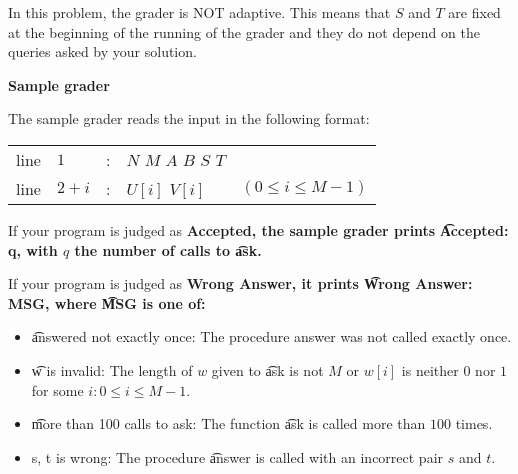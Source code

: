 In this problem, the grader is NOT adaptive. This means that $S$ and $T$ are fixed at the beginning of the running of the grader and they do not depend on the queries asked by your solution.

\bf{Sample grader}

The sample grader reads the input in the following format:

\begin{tabular}{lllll}
line&$1$&:&$N$ $M$ $A$ $B$ $S$ $T$&\\
line&$2+i$&:&$U[i]$ $V[i]$&$(0 \le i \le M-1)$\\
\end{tabular}

If your program is judged as \bf{Accepted}, the sample grader prints \t{Accepted: q}, with $q$ the number of calls to \t{ask}.

If your program is judged as \bf{Wrong Answer}, it prints \t{Wrong Answer: MSG}, where \t{MSG} is one of:

\begin{itemize}
\item \t{answered not exactly once}: The procedure answer was not called exactly once. 
\item \t{w is invalid}: The length of $w$ given to \t{ask} is not $M$ or $w[i]$ is neither $0$ nor $1$ for some $i: 0 \le i \le M-1.$ 
\item \t{more than 100 calls to ask}: The function \t{ask} is called more than $100$ times. 
\item \t{{s, t} is wrong}: The procedure \t{answer} is called with an incorrect pair $s$ and $t.$
\end{itemize}
